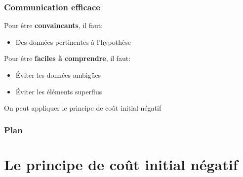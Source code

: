 \documentclass[aspectratio=169]{beamer}
\begin{document}
\begin{frame}[c]\frametitle{Communication efficace}
\onslide<+->
Pour être \textbf{convaincants}, il faut:\vspace{-\parskip}
\begin{itemize}
	\item Des données pertinentes à l'hypothèse
\end{itemize}

Pour être \textbf{faciles à comprendre}, il faut:\vspace{-\parskip}
\begin{itemize}
	\item Éviter les données ambigües
	\item Éviter les éléments superflus
\end{itemize}

\onslide<+->
On peut appliquer le principe de \og coût initial négatif \fg


\end{frame}


\begin{frame}[c]\frametitle{Plan}
    
\tableofcontents

\end{frame}


\section{Le principe de coût initial négatif}
\label{sec:le_principe_de_coût_initial_négatif}
\end{document}
